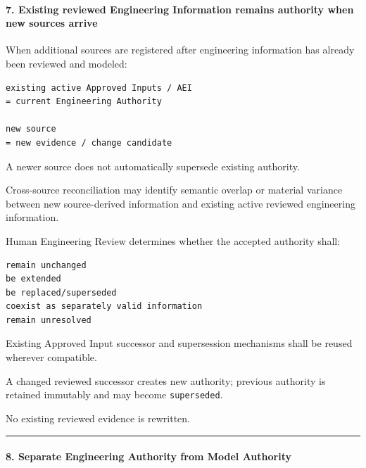 \hypertarget{7-existing-reviewed-engineering-information-remains-authority-when-new-sources-arrive}{%
\paragraph{7. Existing reviewed Engineering Information remains authority when new sources arrive}\label{7-existing-reviewed-engineering-information-remains-authority-when-new-sources-arrive}}

When additional sources are registered after engineering information has already been reviewed and modeled:

\begin{verbatim}
existing active Approved Inputs / AEI
= current Engineering Authority

new source
= new evidence / change candidate
\end{verbatim}

A newer source does not automatically supersede existing authority.

Cross-source reconciliation may identify semantic overlap or material variance between new source-derived information and existing active reviewed engineering information.

Human Engineering Review determines whether the accepted authority shall:

\begin{verbatim}
remain unchanged
be extended
be replaced/superseded
coexist as separately valid information
remain unresolved
\end{verbatim}

Existing Approved Input successor and supersession mechanisms shall be reused wherever compatible.

A changed reviewed successor creates new authority; previous authority is retained immutably and may become \texttt{superseded}.

No existing reviewed evidence is rewritten.

\begin{center}\rule{0.5\linewidth}{0.5pt}\end{center}

\hypertarget{8-separate-engineering-authority-from-model-authority}{%
\paragraph{8. Separate Engineering Authority from Model Authority}\label{8-separate-engineering-authority-from-model-authority}}

